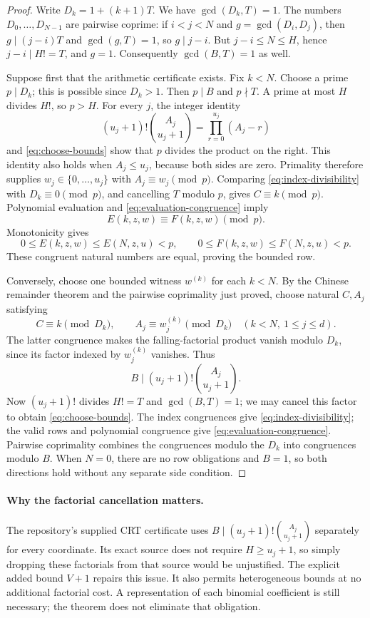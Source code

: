 \begin{proof}
Write $D_k=1+(k+1)T$.  We have $\gcd(D_k,T)=1$.
The numbers $D_0,\ldots,D_{N-1}$ are pairwise coprime: if $i<j<N$
and $g=\gcd(D_i,D_j)$, then $g\mid(j-i)T$ and $\gcd(g,T)=1$,
so $g\mid j-i$.  But $j-i\le N\le H$, hence $j-i\mid H!=T$,
and $g=1$.  Consequently $\gcd(B,T)=1$ as well.

Suppose first that the arithmetic certificate exists.  Fix $k<N$.
Choose a prime $p\mid D_k$; this is possible since $D_k>1$.
Then $p\mid B$ and $p\nmid T$.  A prime at most $H$ divides $H!$,
so $p>H$.  For every $j$, the integer identity
\[
 (u_j+1)!\binom{A_j}{u_j+1}
       =\prod_{r=0}^{u_j}(A_j-r)
\]
and \eqref{eq:choose-bounds} show that $p$ divides the product on the
right.  This identity also holds when $A_j\le u_j$, because both sides
are zero.  Primality therefore supplies $w_j\in\{0,\ldots,u_j\}$
with $A_j\equiv w_j\pmod p$.  Comparing
\eqref{eq:index-divisibility} with $D_k\equiv0\pmod p$, and cancelling
$T$ modulo $p$, gives $C\equiv k\pmod p$.  Polynomial evaluation and
\eqref{eq:evaluation-congruence} imply
\[
 E(k,z,w)\equiv F(k,z,w)\pmod p.
\]
Monotonicity gives
\[
 0\le E(k,z,w)\le E(N,z,u)<p,
 \qquad 0\le F(k,z,w)\le F(N,z,u)<p.
\]
These congruent natural numbers are equal, proving the bounded row.

Conversely, choose one bounded witness $w^{(k)}$ for each $k<N$.
By the Chinese remainder theorem and the pairwise coprimality just proved,
choose natural $C,A_j$ satisfying
\[
 C\equiv k\pmod{D_k},\qquad
 A_j\equiv w_j^{(k)}\pmod{D_k}
 \quad(k<N,\ 1\le j\le d).
\]
The latter congruence makes the falling-factorial product vanish modulo
$D_k$, since its factor indexed by $w_j^{(k)}$ vanishes.  Thus
\[
 B\mid (u_j+1)!\binom{A_j}{u_j+1}.
\]
Now $(u_j+1)!$ divides $H!=T$ and $\gcd(B,T)=1$; we may cancel this
factor to obtain \eqref{eq:choose-bounds}.  The index congruences give
\eqref{eq:index-divisibility}; the valid rows and polynomial congruence
give \eqref{eq:evaluation-congruence}.  Pairwise coprimality combines
the congruences modulo the $D_k$ into congruences modulo $B$.
When $N=0$, there are no row obligations and $B=1$, so both directions
hold without any separate side condition.
\end{proof}

\paragraph{Why the factorial cancellation matters.}
The repository's supplied CRT certificate uses
$B\mid(u_j+1)!\binom{A_j}{u_j+1}$ separately for every coordinate.
Its exact source does not require $H\ge u_j+1$, so simply dropping these
factorials from that source would be unjustified.  The explicit added bound
$V+1$ repairs this issue.  It also permits heterogeneous bounds at no
additional factorial cost.  A representation of each binomial coefficient
is still necessary; the theorem does not eliminate that obligation.

